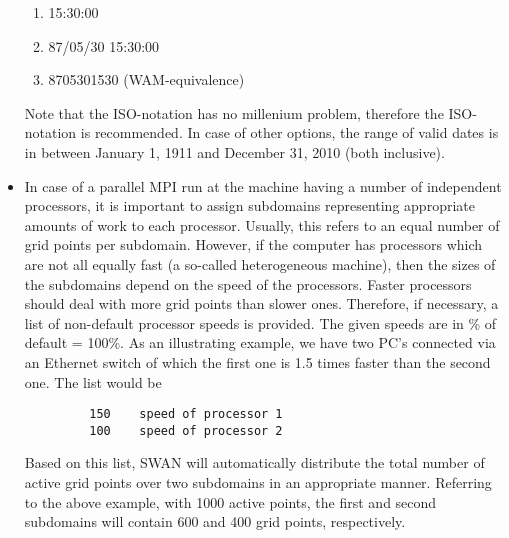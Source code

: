 \documentclass[12pt]{book}
\begin{document}
\begin{itemize}
\begin{enumerate}
            \item 15:30:00
            \item 87/05/30  15:30:00
            \item 8705301530 (WAM-equivalence)
         \end{enumerate}
         Note that the ISO-notation has no millenium problem, therefore the ISO-notation is
         recommended. In case of other options, the range of valid dates is in between January 1,
         1911 and December 31, 2010 (both inclusive).
   \item In case of a parallel MPI run at the machine having a number of independent processors,
         it is important to assign subdomains representing appropriate amounts of work to each
         processor. Usually, this refers to an equal number of grid points per subdomain. However,
         if the computer has processors which are not all equally fast (a so-called heterogeneous
         machine), then the sizes of the subdomains depend on the speed of the processors.
         Faster processors should deal with more grid points than slower ones. Therefore, if
         necessary, a list of non-default processor speeds is provided. The given speeds are in
         \% of default = 100\%. As an illustrating example, we have two PC's connected via an
         Ethernet switch of which the first one is 1.5 times faster than the second one. The list
         would be
         \begin{verbatim}
         150    speed of processor 1
         100    speed of processor 2
         \end{verbatim}
         Based on this list, SWAN will automatically distribute the total number of active grid points
         over two subdomains in an appropriate manner. Referring to the above example, with 1000 active
         points, the first and second subdomains will contain 600 and 400 grid points, respectively.
\end{itemize}

 \label{ch:usage}
\end{document}
